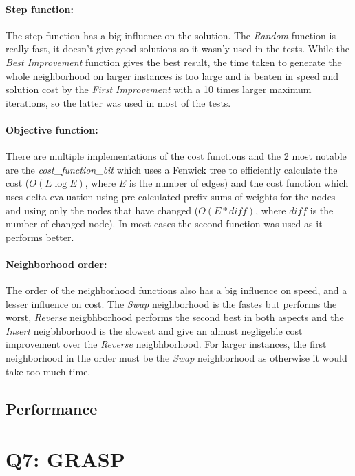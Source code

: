 \documentclass{article}
\begin{document}
\paragraph{Step function:}
The step function has a big influence on the solution. The \textit{Random} function is really fast, it doesn't give good solutions so it wasn'y used in the tests. While the \textit{Best Improvement} function gives the best result, the time taken to generate the whole neighborhood on larger instances is too large and is beaten in speed and solution cost by the \textit{First Improvement} with a 10 times larger maximum iterations, so the latter was used in most of the tests.

\paragraph{Objective function:}
There are multiple implementations of the cost functions and the 2 most notable are the \textit{cost\_function\_bit} which uses a Fenwick tree to efficiently calculate the cost ($O(E \log E)$, where $E$ is the number of edges) and the cost function which uses delta evaluation using pre calculated prefix sums of weights for the nodes and using only the nodes that have changed ($O(E*diff)$, where $diff$ is the number of changed node). In most cases the second function was used as it performs better.

\paragraph{Neighborhood order:}
The order of the neighborhood functions also has a big influence on speed, and a lesser influence on cost. The \textit{Swap} neighborhood is the fastes but performs the worst, \textit{Reverse} neigbhborhood performs the second best in both aspects and the \textit{Insert} neigbhborhood is the slowest and give an almost negligeble cost improvement over the \textit{Reverse} neigbhborhood. For larger instances, the first neighborhood in the order must be the \textit{Swap} neighborhood as otherwise it would take too much time.


\subsection*{Performance}

\section*{Q7: GRASP}
\end{document}
